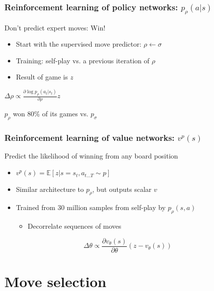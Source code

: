 \documentclass{beamer}
\begin{document}
\begin{frame}
  \frametitle{Reinforcement learning of policy networks: $p_\rho(a|s)$}
  Don't predict expert moves: Win!
  \begin{itemize}
  \item Start with the supervised move predictor: $\rho \leftarrow \sigma$
  \item Training: self-play vs. a previous iteration of $\rho$
  \item Result of game is $z$
  \end{itemize}
  \begin{tcolorbox}
    \begin{center}
      $\Delta \rho \propto \frac{\partial \log p_\rho(a_t|s_t)}{\partial \rho}z$
    \end{center}
  \end{tcolorbox}
  $p_\rho$ won 80\% of its games vs. $p_\sigma$
\end{frame}


\begin{frame}
  \frametitle{Reinforcement learning of value networks: $v^p(s)$}
  Predict the likelihood of winning from any board position
  \begin{itemize}
  \item $v^p(s) = \mathbb{E}\left[ z | s = s_t, a_{t\ldots T} \sim p\right]$
  \item Similar architecture to $p_\rho$, but outputs scalar $v$
  \item Trained from 30 million samples from self-play by $p_\rho(s,a)$
    \begin{itemize}
    \item Decorrelate sequences of moves
    \end{itemize}
  \end{itemize}
  \begin{tcolorbox}
    \begin{equation*}
      \Delta \theta \propto \frac{\partial v_\theta(s)}{\partial \theta}(z-v_\theta(s))
    \end{equation*}
  \end{tcolorbox}
\end{frame}




\section{Move selection}
\end{document}
